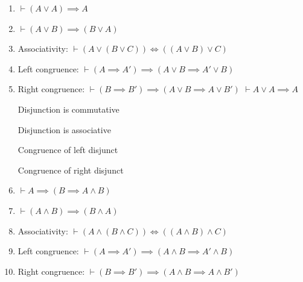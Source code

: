 \begin{node}
\begin{enumerate}
\LA{}Prove $\vdash(A\implies B)\implies((A\implies\neg B)\implies\neg A)$~{\nwtagstyle{}}\RA{}
\nwendcode{}\nwdocspar
\item {} $\vdash(A\lor A)\implies A$
\item {} $\vdash(A\lor B)\implies(B\lor A)$
\item {} Associativity: $\vdash(A\lor(B\lor C))\iff((A\lor B)\lor C)$
\item {} Left congruence: $\vdash(A\implies A')\implies(A\lor B\implies A'\lor B)$
\item {} Right congruence: $\vdash(B\implies B')\implies(A\lor B\implies A\lor B')$
\nwenddocs{}\plusendmoddef\nwstartdeflinemarkup{}\nwenddeflinemarkup
\LA{}$\vdash A\lor A\implies A$~{\nwtagstyle{}}\RA{}

\LA{}Disjunction is commutative~{\nwtagstyle{}}\RA{}

\LA{}Disjunction is associative~{\nwtagstyle{}}\RA{}

\LA{}Congruence of left disjunct~{\nwtagstyle{}}\RA{}

\LA{}Congruence of right disjunct~{\nwtagstyle{}}\RA{}
\nwendcode{}\nwdocspar
\item {} $\vdash A\implies(B\implies A\land B)$
\item {} $\vdash(A\land B)\implies(B\land A)$
\item {} Associativity: $\vdash(A\land(B\land C))\iff((A\land B)\land C)$
\item {} Left congruence: $\vdash(A\implies A')\implies(A\land B\implies A'\land B)$
\item {} Right congruence: $\vdash(B\implies B')\implies(A\land B\implies A\land B')$


\end{enumerate}
\end{node}
